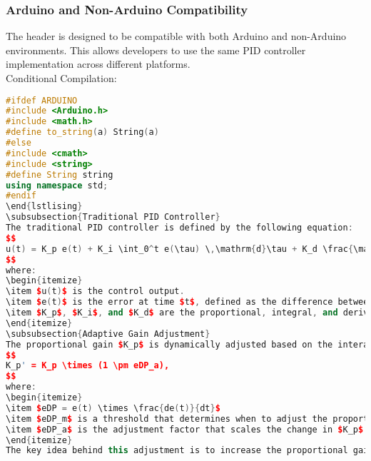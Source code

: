\documentclass[a4paper,12pt]{report}
\begin{document}
\subsubsection{Arduino and Non-Arduino Compatibility}
The header is designed to be compatible with both Arduino and non-Arduino environments. This allows developers to use the same PID controller implementation across different platforms.\\
Conditional Compilation:
\begin{lstlisting}[language=C++]
#ifdef ARDUINO
#include <Arduino.h>
#include <math.h>
#define to_string(a) String(a)
#else
#include <cmath>
#include <string>
#define String string
using namespace std;
#endif
\end{lstlising}
\subsubsection{Traditional PID Controller}
The traditional PID controller is defined by the following equation:
$$
u(t) = K_p e(t) + K_i \int_0^t e(\tau) \,\mathrm{d}\tau + K_d \frac{\mathrm{d}e(t)}{\mathrm{d}t},
$$
where:
\begin{itemize}
\item $u(t)$ is the control output.
\item $e(t)$ is the error at time $t$, defined as the difference between the desired value and the measured value.
\item $K_p$, $K_i$, and $K_d$ are the proportional, integral, and derivative gains, respectively.
\end{itemize}
\subsubsection{Adaptive Gain Adjustment}
The proportional gain $K_p$ is dynamically adjusted based on the interaction between the current error $e(t)$ and its rate of change (derivative). This adjustment is designed to improve the responsiveness of the controller to changing conditions. The adaptation can be mathematically expressed as follows:
$$
K_p' = K_p \times (1 \pm eDP_a),
$$
where:
\begin{itemize}
\item $eDP = e(t) \times \frac{de(t)}{dt}$
\item $eDP_m$ is a threshold that determines when to adjust the proportional gain.
\item $eDP_a$ is the adjustment factor that scales the change in $K_p$ based on the error’s derivative. 
\end{itemize}
The key idea behind this adjustment is to increase the proportional gain when the system is experiencing a large error combined with a significant rate of change, which could indicate an approaching overshoot or oscillation. Conversely, if the error is decreasing but remains large, it may reduce the proportional gain to prevent excessive correction, allowing the system to stabilize more smoothly.

\end{lstlisting}
\end{document}
